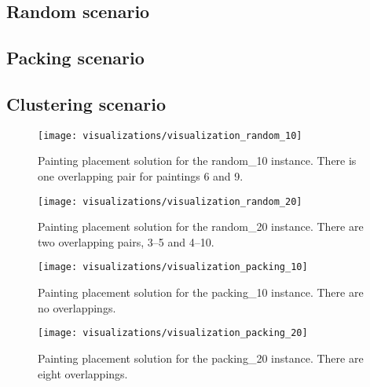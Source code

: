 \subsection{Random scenario}\label{subsec:random-scenario}

\subsection{Packing scenario}\label{subsec:packing-scenario}

\subsection{Clustering scenario}\label{subsec:clustering-scenario}

\begin{figure}[h!]
    \texttt{[image: visualizations/visualization\_random\_10]}
    \caption[Painting placement solution for the random\_10 instance]
        {Painting placement solution for the random\_10 instance.
    There is one overlapping pair for paintings 6 and 9.}
    \label{fig:results:visualization-random-10}
\end{figure}

\begin{figure}[h!]
    \texttt{[image: visualizations/visualization\_random\_20]}
    \caption[Painting placement solution for the random\_20 instance]
        {Painting placement solution for the random\_20 instance.
    There are two overlapping pairs, 3–5 and 4–10.}
    \label{fig:results:visualization-random-20}
\end{figure}

\begin{figure}[h!]
    \texttt{[image: visualizations/visualization\_packing\_10]}
    \caption[Painting placement solution for the packing\_10 instance]
        {Painting placement solution for the packing\_10 instance.
    There are no overlappings.}
    \label{fig:results:visualization-packing-10}
\end{figure}

\begin{figure}[h!]
    \texttt{[image: visualizations/visualization\_packing\_20]}
    \caption[Painting placement solution for the packing\_20 instance]
        {Painting placement solution for the packing\_20 instance.
    There are eight overlappings.}
    \label{fig:results:visualization-packing-20}
\end{figure}

